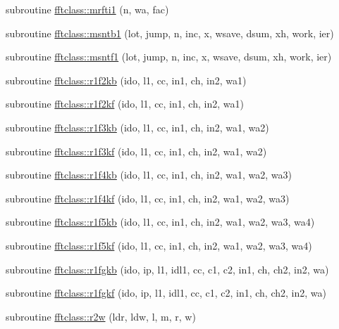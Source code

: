 \begin{DoxyCompactItemize}
\item 
subroutine \mbox{\hyperlink{namespacefftclass_a88a3f7fd420d15d4e4d603d4d8ebf38e}{fftclass\+::mrfti1}} (n, wa, fac)
\item 
subroutine \mbox{\hyperlink{namespacefftclass_aebd25014fd97baa3be31bda9b446e99f}{fftclass\+::msntb1}} (lot, jump, n, inc, x, wsave, dsum, xh, work, ier)
\item 
subroutine \mbox{\hyperlink{namespacefftclass_a151bd1685dbe69c9c36a08ff00a7e10e}{fftclass\+::msntf1}} (lot, jump, n, inc, x, wsave, dsum, xh, work, ier)
\item 
subroutine \mbox{\hyperlink{namespacefftclass_a6cf75b3c3c340adb4eb40e50289cf439}{fftclass\+::r1f2kb}} (ido, l1, cc, in1, ch, in2, wa1)
\item 
subroutine \mbox{\hyperlink{namespacefftclass_a9d3bdd521a616fe934704cb38ac074f4}{fftclass\+::r1f2kf}} (ido, l1, cc, in1, ch, in2, wa1)
\item 
subroutine \mbox{\hyperlink{namespacefftclass_ad450dc5bf08d49d4784e609c41b42950}{fftclass\+::r1f3kb}} (ido, l1, cc, in1, ch, in2, wa1, wa2)
\item 
subroutine \mbox{\hyperlink{namespacefftclass_a382f39146e7d8e1450810efdc6f4cd79}{fftclass\+::r1f3kf}} (ido, l1, cc, in1, ch, in2, wa1, wa2)
\item 
subroutine \mbox{\hyperlink{namespacefftclass_a71f9b9a5e0173f9ddef4dd0fc92e6164}{fftclass\+::r1f4kb}} (ido, l1, cc, in1, ch, in2, wa1, wa2, wa3)
\item 
subroutine \mbox{\hyperlink{namespacefftclass_ac2e28efef69b7ac5c599c51dc9be973d}{fftclass\+::r1f4kf}} (ido, l1, cc, in1, ch, in2, wa1, wa2, wa3)
\item 
subroutine \mbox{\hyperlink{namespacefftclass_a42f5de07f4eb994cbe15a8526291566b}{fftclass\+::r1f5kb}} (ido, l1, cc, in1, ch, in2, wa1, wa2, wa3, wa4)
\item 
subroutine \mbox{\hyperlink{namespacefftclass_acc419931cfa3ec3e19e6264b35e83aae}{fftclass\+::r1f5kf}} (ido, l1, cc, in1, ch, in2, wa1, wa2, wa3, wa4)
\item 
subroutine \mbox{\hyperlink{namespacefftclass_aa5cb9e2d3b6aa9d5adcb4144cd17f10e}{fftclass\+::r1fgkb}} (ido, ip, l1, idl1, cc, c1, c2, in1, ch, ch2, in2, wa)
\item 
subroutine \mbox{\hyperlink{namespacefftclass_adb327056327448d0a605271d57091578}{fftclass\+::r1fgkf}} (ido, ip, l1, idl1, cc, c1, c2, in1, ch, ch2, in2, wa)
\item 
subroutine \mbox{\hyperlink{namespacefftclass_a6d2b5609d651241869584e962d234756}{fftclass\+::r2w}} (ldr, ldw, l, m, r, w)

\end{DoxyCompactItemize}
